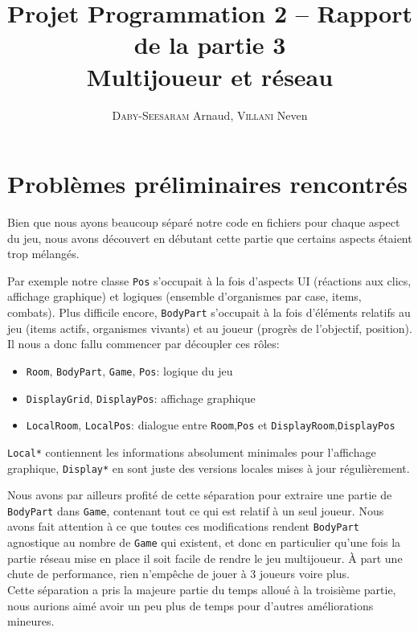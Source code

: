 \documentclass[a4paper,french]{article}
\title{Projet Programmation 2 -- Rapport de la partie 3\\Multijoueur et r\'eseau}
\author{\textsc{Daby-Seesaram} Arnaud, \textsc{Villani} Neven}
\date{}
\newcommand{\ttt}[1]{\texttt{#1}}
\begin{document}
\maketitle

\section{Probl\`emes préliminaires rencontr\'es}

Bien que nous ayons beaucoup s\'epar\'e notre code en fichiers pour chaque aspect du jeu,
nous avons d\'ecouvert en d\'ebutant cette partie que certains aspects \'etaient trop
m\'elang\'es.

Par exemple notre classe \ttt{Pos} s'occupait \`a la fois d'aspects UI (r\'eactions aux
clics, affichage graphique) et logiques (ensemble d'organismes par case, items, combats).
Plus difficile encore, \ttt{BodyPart} s'occupait \`a la fois d'\'el\'ements relatifs au
jeu (items actifs, organismes vivants) et au joueur (progr\`es de l'objectif, position).\\

Il nous a donc fallu commencer par d\'ecoupler ces r\^oles:
\begin{itemize}
    \item \ttt{Room}, \ttt{BodyPart}, \ttt{Game}, \ttt{Pos}: logique du jeu
    \item \ttt{DisplayGrid}, \ttt{DisplayPos}: affichage graphique
    \item \ttt{LocalRoom}, \ttt{LocalPos}: dialogue entre \ttt{Room},\ttt{Pos} et \ttt{DisplayRoom},\ttt{DisplayPos}
\end{itemize}

\ttt{Local*} contiennent les informations absolument minimales pour l'affichage graphique, \ttt{Display*} en sont
juste des versions locales mises \`a jour r\'eguli\`erement.

Nous avons par ailleurs profit\'e de cette s\'eparation pour extraire une partie de
\ttt{BodyPart} dans \ttt{Game}, contenant tout ce qui est relatif \`a un seul joueur.
Nous avons fait attention \`a ce que toutes ces modifications rendent \ttt{BodyPart}
agnostique au nombre de \ttt{Game} qui existent, et donc en particulier qu'une fois la
partie r\'eseau mise en place il soit facile de rendre le jeu multijoueur.
\`A part une chute de performance, rien n'emp\^eche de jouer \`a 3 joueurs voire plus.\\

Cette s\'eparation a pris la majeure partie du temps allou\'e \`a la troisi\`eme partie,
nous aurions aim\'e avoir un peu plus de temps pour d'autres am\'eliorations mineures.
\end{document}

